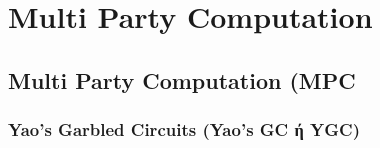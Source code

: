 \chapter{Multi Party Computation}

\section{Multi Party Computation (MPC}




\subsection{Yao's Garbled Circuits (Yao's GC ή YGC)}